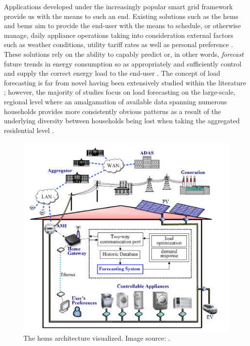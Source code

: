 \noindent \newline Applications developed under the increasingly popular smart grid framework provide us with the means to such an end. Existing solutions such as the \gls{hems} and \gls{bems} aim to provide the end-user with the means to schedule, or otherwise manage, daily appliance operations taking into consideration external factors such as weather conditions, utility tariff rates as well as personal preference \cite{Yildiz}. These solutions rely on the ability to capably predict or, in other words, \textit{forecast} future trends in energy consumption \cite{Kareem} so as appropriately and sufficiently control and supply the correct energy load to the end-user \cite{Raza}. The concept of load forecasting is far from novel having been extensively studied within the literature \cite{Foucquier}; however, the majority of studies focus on load forecasting on the large-scale, regional level where an amalgamation of available data spanning numerous households provides more consistently obvious patterns as a result of the underlying diversity between households being lost when taking the aggregated residential level \cite{Kong}.

\begin{figure}[hbt!]
    \centering
    \includegraphics[width=\textwidth]{Images/Chapter 1/Yang/HEMS-Architecture.pdf}
    \caption{The \gls{hems} architecture visualized. Image source: \cite{Yang} .}
    \label{fig:HEMS-Architecture}
\end{figure}

